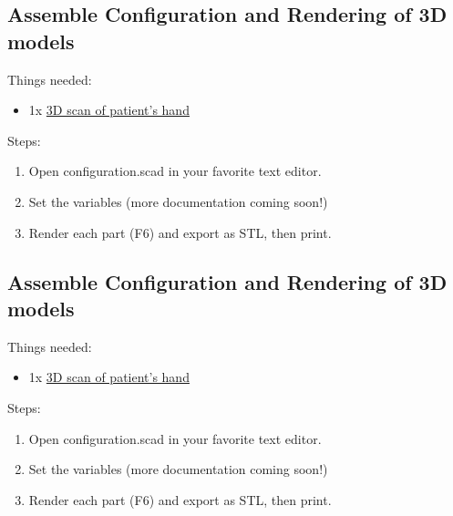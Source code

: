 \documentclass[11pt]{article}
\begin{document}
\subsection{Assemble Configuration and Rendering of 3D models}
Things needed:
\begin{itemize}
\item 1x \hyperlink{thing_hand\_scan}{3D scan of patient's hand}
\end{itemize}
Steps:
\begin{enumerate}
\item Open configuration.scad in your favorite text editor.
\item Set the variables (more documentation coming soon!)
\item Render each part (F6) and export as STL, then print.
\end{enumerate}

\subsection{Assemble Configuration and Rendering of 3D models}
Things needed:
\begin{itemize}
\item 1x \hyperlink{thing_hand\_scan}{3D scan of patient's hand}
\end{itemize}
Steps:
\begin{enumerate}
\item Open configuration.scad in your favorite text editor.
\item Set the variables (more documentation coming soon!)
\item Render each part (F6) and export as STL, then print.
\end{enumerate}
\end{document}
